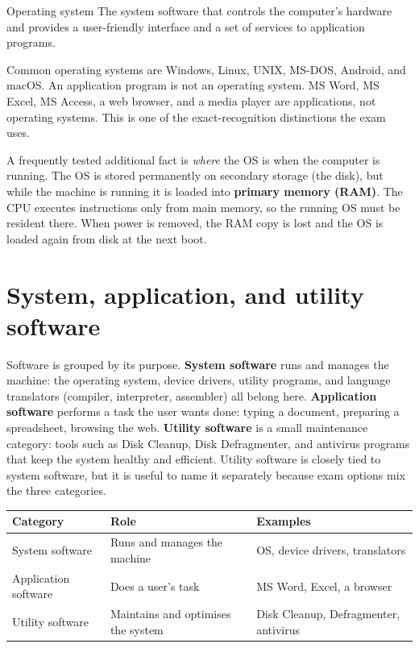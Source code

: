 \begin{definitionbox}{Operating system}
The system software that controls the computer's hardware and provides a
user-friendly interface and a set of services to application programs.
\end{definitionbox}

Common operating systems are Windows, Linux, UNIX, MS-DOS, Android, and
macOS. An application program is not an operating system. MS Word, MS Excel,
MS Access, a web browser, and a media player are applications, not operating
systems. This is one of the exact-recognition distinctions the exam uses.

A frequently tested additional fact is \emph{where} the OS is when the
computer is running. The OS is stored permanently on secondary storage (the
disk), but while the machine is running it is loaded into \textbf{primary
memory (RAM)}. The CPU executes instructions only from main memory, so the
running OS must be resident there. When power is removed, the RAM copy is
lost and the OS is loaded again from disk at the next boot.

\section{System, application, and utility software}
Software is grouped by its purpose. \textbf{System software} runs and manages
the machine: the operating system, device drivers, utility programs, and
language translators (compiler, interpreter, assembler) all belong here.
\textbf{Application software} performs a task the user wants done: typing a
document, preparing a spreadsheet, browsing the web. \textbf{Utility
software} is a small maintenance category: tools such as Disk Cleanup, Disk
Defragmenter, and antivirus programs that keep the system healthy and
efficient. Utility software is closely tied to system software, but it is
useful to name it separately because exam options mix the three categories.

\begin{center}
\begin{tabular}{p{}p{}p{}}
\toprule
\textbf{Category} & \textbf{Role} & \textbf{Examples} \\
\midrule
System software & Runs and manages the machine & OS, device drivers, translators \\
Application software & Does a user's task & MS Word, Excel, a browser \\
Utility software & Maintains and optimises the system & Disk Cleanup, Defragmenter, antivirus \\
\bottomrule
\end{tabular}
\end{center}


